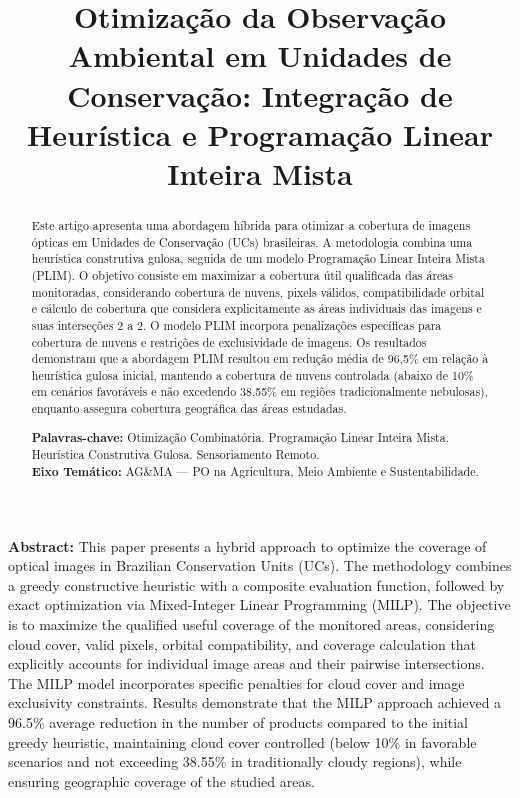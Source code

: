\documentclass[a4paper,11pt]{article}
\title{\textbf{\Large Otimização da Observação Ambiental em Unidades de Conservação: Integração de Heurística e Programação Linear Inteira Mista}}%
\date{}
\let\oldmaketitle\maketitle
\renewcommand{\maketitle}{%
  \oldmaketitle
  \thispagestyle{fancy}
}
\begin{document}
\maketitle
\vspace{-8mm}
\begin{abstract}
    Este artigo apresenta uma abordagem híbrida para otimizar a cobertura de imagens ópticas em Unidades de Conservação (UCs) brasileiras. A metodologia combina uma heurística construtiva gulosa, seguida de um modelo Programação Linear Inteira Mista (PLIM). O objetivo consiste em maximizar a cobertura útil qualificada das áreas monitoradas, considerando cobertura de nuvens, pixels válidos, compatibilidade orbital e cálculo de cobertura que considera explicitamente as áreas individuais das imagens e suas interseções $2$ a $2$. O modelo PLIM incorpora penalizações específicas para cobertura de nuvens e restrições de exclusividade de imagens. Os resultados demonstram que a abordagem PLIM resultou em redução média de 96,5\% em relação à heurística gulosa inicial, mantendo a cobertura de nuvens controlada (abaixo de 10\% em cenários favoráveis e não excedendo 38,55\% em regiões tradicionalmente nebulosas), enquanto assegura cobertura geográfica das áreas estudadas.

    \bigskip
    \noindent
    \textbf{Palavras-chave:} Otimização Combinatória. Programação Linear Inteira Mista. Heurística Construtiva Gulosa. Sensoriamento Remoto.\\
    \noindent\textbf{Eixo Temático:} AG\&MA --- PO na Agricultura, Meio Ambiente e Sustentabilidade.
    \end{abstract}
    
    \bigskip

    
    \bigskip
    
\noindent\textbf{Abstract:} 
    This paper presents a hybrid approach to optimize the coverage of optical images in Brazilian Conservation Units (UCs). The methodology combines a greedy constructive heuristic with a composite evaluation function, followed by exact optimization via Mixed-Integer Linear Programming (MILP). The objective is to maximize the qualified useful coverage of the monitored areas, considering cloud cover, valid pixels, orbital compatibility, and coverage calculation that explicitly accounts for individual image areas and their pairwise intersections. The MILP model incorporates specific penalties for cloud cover and image exclusivity constraints. Results demonstrate that the MILP approach achieved a 96.5\% average reduction in the number of products compared to the initial greedy heuristic, maintaining cloud cover controlled (below 10\% in favorable scenarios and not exceeding 38.55\% in traditionally cloudy regions), while ensuring geographic coverage of the studied areas.
\end{document}
